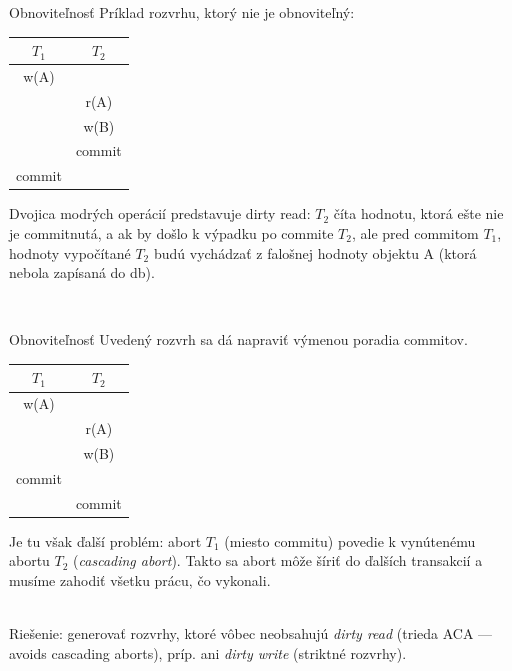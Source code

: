 \documentclass[12pt]{beamer}
\def\blue#1{\textcolor{Cerulean}{#1}}
\begin{document}
\begin{frame}[fragile]{Obnoviteľnosť}
Príklad rozvrhu, ktorý \alert{nie je obnoviteľný}:\\[5mm]
\begin{minipage}{.4\pdfpagewidth}
\begin{tabular}{c|c}
  $T_1$         & $T_2$        \\\hline\hline
  \blue{w(A)}   &              \\\hline
                & \blue{r(A)}  \\\hline
                & w(B)         \\\hline
                & commit       \\\hline
  commit        &              \\
\end{tabular}
\end{minipage}
\begin{minipage}{.4\pdfpagewidth}
Dvojica modrých operácií predstavuje \alert{dirty read}:
$T_2$ číta hodnotu, ktorá ešte nie je commitnutá, a ak by došlo k výpadku po commite $T_2$, ale pred commitom $T_1$,
hodnoty vypočítané $T_2$ budú vychádzať z falošnej hodnoty objektu A (ktorá  nebola zapísaná do db).
\end{minipage}
\\[12mm]
\end{frame}


\begin{frame}[fragile]{Obnoviteľnosť}
Uvedený rozvrh sa dá napraviť výmenou poradia commitov.\\[5mm]
\begin{minipage}{.4\pdfpagewidth}
\begin{tabular}{c|c}
  $T_1$         & $T_2$        \\\hline\hline
  \blue{w(A)}   &              \\\hline
                & \blue{r(A)}  \\\hline
                & w(B)         \\\hline
  commit        &              \\\hline
                & commit       \\
\end{tabular}
\end{minipage}
\begin{minipage}{.4\pdfpagewidth}
Je tu však ďalší problém: abort $T_1$ (miesto commitu) povedie k vynútenému abortu $T_2$ (\emph{cascading abort}).
Takto sa abort môže šíriť do ďalších transakcií a musíme zahodiť všetku prácu, čo vykonali.
\end{minipage}
\\[5mm]
Riešenie: generovať rozvrhy, ktoré vôbec neobsahujú \emph{dirty read} (trieda ACA --- avoids cascading aborts),
príp. ani \emph{dirty write} (\alert{striktné} rozvrhy).
\end{frame}
\end{document}
